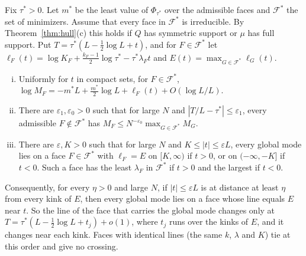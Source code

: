\begin{theorem}\label{thm:window}
Fix $\tau^*>0$. Let $m^*$ be the least value of $\Phi_{\tau^*}$ over the
admissible faces and $\mathcal F^*$ the set of minimizers. Assume that every
face in $\mathcal F^*$ is irreducible. By Theorem~\ref{thm:hull}(c) this holds
if $Q$ has symmetric support or $\mu$ has full support. Put $T=\tau^*(L-\frac12\log L+t)$, and for
$F\in\mathcal F^*$ let
$\ell_F(t)=\log K_F+\frac{k_F-1}2\log\tau^*-\tau^*\lambda_Ft$ and
$E(t)=\max_{G\in\mathcal F^*}\ell_G(t)$.
\begin{enumerate}[(i)]
\item Uniformly for $t$ in compact sets, for $F\in\mathcal F^*$,
$\log M_F=-m^*L+\frac{m^*}2\log L+\ell_F(t)+O(\log L/L)$.
\item There are $\varepsilon_1,\varepsilon_0>0$ such that for large $N$ and
$|T/L-\tau^*|\le\varepsilon_1$, every admissible $F\notin\mathcal F^*$ has
$M_F\le N^{-\varepsilon_0}\max_{G\in\mathcal F^*}M_G$.
\item There are $\varepsilon,K>0$ such that for large $N$ and
$K\le|t|\le\varepsilon L$, every global mode lies on a face
$F\in\mathcal F^*$ with $\ell_F=E$ on $[K,\infty)$ if $t>0$, or on
$(-\infty,-K]$ if $t<0$. Such a face has the least $\lambda_F$ in
$\mathcal F^*$ if $t>0$ and the largest if $t<0$.
\end{enumerate}
Consequently, for every $\eta>0$ and large $N$, if $|t|\le\varepsilon L$ is at
distance at least $\eta$ from every kink of $E$, then every global mode lies
on a face whose line equals $E$ near $t$. So the line of the face that
carries the global mode changes only at
$T=\tau^*(L-\frac12\log L+t_j)+o(1)$, where $t_j$ runs over the kinks of $E$,
and it changes near each kink. Faces with identical lines (the same $k$,
$\lambda$ and $K$) tie at this order and give no crossing.
\end{theorem}

